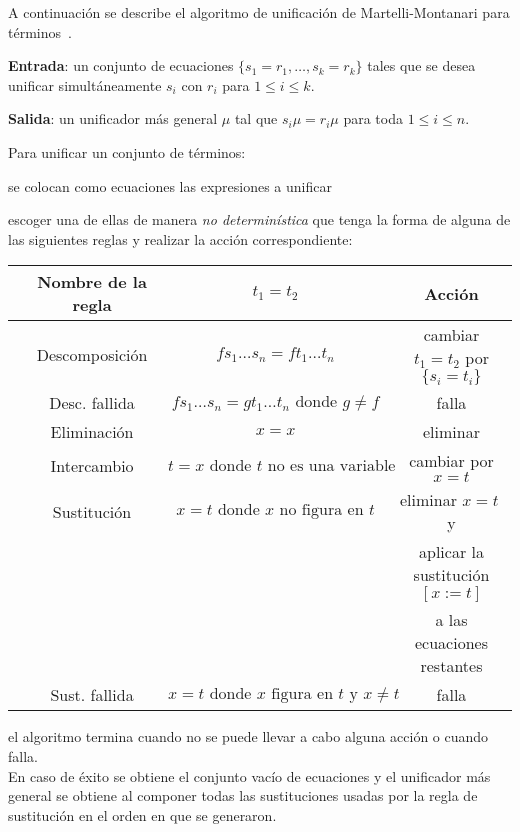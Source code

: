 \documentclass[11pt,letterpaper]{article}
\begin{document}
\noindent A continuación se describe el algoritmo de unificación de 
Martelli-Montanari para t\'erminos~\cite{MartelliMontanari}.

\bi
\item[] \textbf{Entrada}: un conjunto de ecuaciones 
$\{s_1=r_1,\ldots,s_k=r_k\}$ tales que 
se desea unificar simult\'aneamente $s_i$ con $r_i$ para $1\leq i\leq k$.
\item[] \textbf{Salida}: un unificador más general $\mu$ tal que 
$s_i\mu=r_i\mu$ para toda $1\leq i\leq n$.
\ei

\noindent Para unificar un conjunto de términos:
\bi
\item se colocan como ecuaciones las expresiones a unificar
\item escoger una de ellas de manera \textit{no determin\'istica} que tenga la 
forma de alguna de las siguientes reglas y realizar la acci\'on correspondiente:

\begin{tabular}{lc|c|c}
& Nombre de la regla & $t_1 = t_2 $  &  Acci\'on\\\hline
{\sc [Desc]} & Descomposición &  $fs_1\dots s_n = ft_1\dots t_n$ 
  & \small{cambiar $t_1 = t_2 $ por $\{s_i = t_i\}$} \\
{\sc [DFalla]} & Desc. fallida & 
  $fs_1\dots s_n=gt_1\dots t_n\text{ donde } g\neq f$  
  & \small{falla}\\
{\sc [Elim]} & Eliminación &  $x = x$ & \small{eliminar} \\
{\sc [Swap]} & Intercambio & 
  $t = x \text{ donde } t \text{ no es una variable }$
  & \small{cambiar por $x=t$}\\
{\sc [Sust]} & Sustitución &  $x = t \text{ donde } x \text{ no figura en } t$  
  &  \small{eliminar $x=t\;$ y }\\ 
  & & & \small{aplicar la sustituci\'on $[x:=t]$}\\ %
  & & & \small{a las ecuaciones restantes }\\
{\sc [SFalla]} & Sust. fallida & 
  $x = t \text{ donde } x \text{ figura en } t \text{ y } x\neq t$ 
  & \small{falla}
\end{tabular}

\item el algoritmo termina cuando no se puede llevar a cabo alguna acci\'on 
o cuando falla. \\
En caso de \'exito se obtiene el conjunto vacío de ecuaciones 
y el unificador m\'as general se obtiene al componer todas las sustituciones 
usadas por la regla de sustitución en el orden en que se generaron.
\ei
\end{document}
